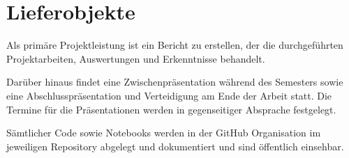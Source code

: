 \section{Lieferobjekte}
Als primäre Projektleistung ist ein Bericht zu erstellen, der die durchgeführten Projektarbeiten, Auswertungen und Erkenntnisse behandelt. 

Darüber hinaus findet eine Zwischenpräsentation während des Semesters sowie eine Abschlusspräsentation und Verteidigung am Ende der Arbeit statt. Die Termine für die Präsentationen werden in gegenseitiger Absprache festgelegt. 

Sämtlicher Code sowie Notebooks werden in der GitHub Organisation im jeweiligen Repository abgelegt und dokumentiert und sind öffentlich einsehbar.

